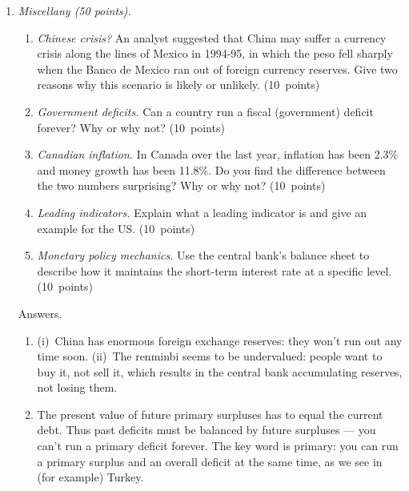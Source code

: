 \documentclass[letterpaper,12pt]{article}
\begin{document}
\begin{enumerate}
\begin{enumerate}
\end{enumerate}


\item {\it Miscellany (50 points).}

\begin{enumerate}
\item {\it Chinese crisis?\/}
An analyst suggested that China may suffer a currency crisis
along the lines of Mexico in 1994-95,
in which the peso fell sharply when the Banco de Mexico
ran out of foreign currency reserves.
Give two reasons why this scenario is likely or unlikely.
 (10~points)

\item {\it Government deficits.\/}
Can a country run a fiscal (government) deficit forever?
Why or why not?
 (10~points)


\item {\it Canadian inflation.\/}
In Canada over the last year, inflation has been 2.3\%
and money growth  has been 11.8\%.
Do you find the difference between the two numbers surprising?
Why or why not?  (10~points)

\item {\it Leading indicators.\/}
Explain what a leading indicator is
and give an example for the US.  (10~points)

\item {\it Monetary policy mechanics.\/}
Use the central bank's balance sheet to describe 
how it 
maintains the short-term interest rate at a specific level.
(10~points)

\end{enumerate}
Answers.
\begin{enumerate}
\item 
(i)~China has enormous foreign exchange 
reserves:  they won't run out any time soon.
(ii)~The renminbi seems to be undervalued:  
people want to buy it,
not sell it, which results in the central bank accumulating reserves,
not losing them.

\item 
The present value of future primary surpluses has to equal
the current debt.  Thus past deficits must be balanced by future
surpluses --- you can't run a primary deficit forever. The key word
is primary:  you can run a primary surplus and an overall deficit at
the same time, as we see in (for example) Turkey.


\end{enumerate}
\end{enumerate}
\end{document}
